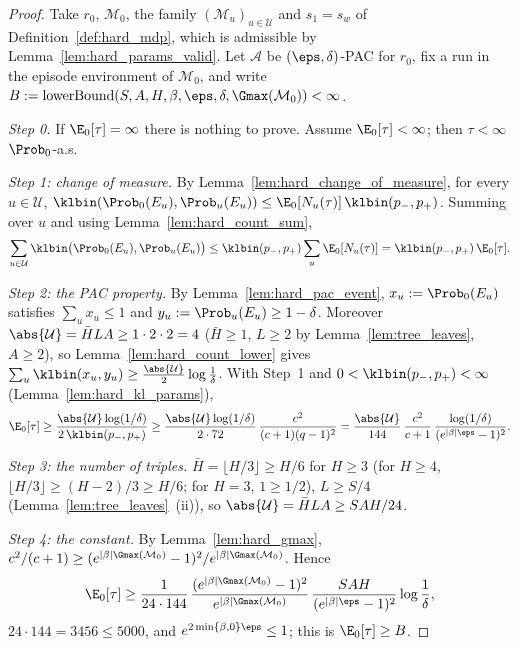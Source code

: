 \begin{proof}
\leanok
{}
Take $r_0$, $\mathcal M_0$, the family $(\mathcal M_u)_{u \in \mathcal U}$ and $s_1 = s_w$ of
Definition~\ref{def:hard_mdp}, which is admissible by Lemma~\ref{lem:hard_params_valid}. Let
$\mathcal A$ be $(\eps,\delta)$-PAC for $r_0$, fix a run in the episode environment of
$\mathcal M_0$, and write $B := \mathrm{lowerBound}(S,A,H,\beta,\eps,\delta,\Gmax(\mathcal M_0)) < \infty$.

\emph{Step 0.} If $\E_0[\tau] = \infty$ there is nothing to prove. Assume $\E_0[\tau] < \infty$;
then $\tau < \infty$ $\Prob_0$-a.s.

\emph{Step 1: change of measure.} By Lemma~\ref{lem:hard_change_of_measure}, for every
$u \in \mathcal U$, $\klbin(\Prob_0(E_u), \Prob_u(E_u)) \le \E_0[N_u(\tau)]\,\klbin(p_-,p_+)$. Summing
over $u$ and using Lemma~\ref{lem:hard_count_sum},
\[
  \sum_{u \in \mathcal U}\klbin\big(\Prob_0(E_u), \Prob_u(E_u)\big) \le \klbin(p_-,p_+)\sum_{u}\E_0[N_u(\tau)] = \klbin(p_-,p_+)\,\E_0[\tau] .
\]

\emph{Step 2: the PAC property.} By Lemma~\ref{lem:hard_pac_event}, $x_u := \Prob_0(E_u)$
satisfies $\sum_u x_u \le 1$ and $y_u := \Prob_u(E_u) \ge 1 - \delta$. Moreover
$\abs{\mathcal U} = \bar H L A \ge 1\cdot 2\cdot 2 = 4$ ($\bar H \ge 1$, $L \ge 2$ by
Lemma~\ref{lem:tree_leaves}, $A \ge 2$), so Lemma~\ref{lem:hard_count_lower} gives
$\sum_u \klbin(x_u, y_u) \ge \frac{\abs{\mathcal U}}{2}\log\frac1\delta$. With Step~1 and
$0 < \klbin(p_-,p_+) < \infty$ (Lemma~\ref{lem:hard_kl_params}),
\[
  \E_0[\tau] \ge \frac{\abs{\mathcal U}\log(1/\delta)}{2\,\klbin(p_-,p_+)} \ge \frac{\abs{\mathcal U}\log(1/\delta)}{2\cdot 72}\,\frac{c^2}{(c+1)(q-1)^2}
  = \frac{\abs{\mathcal U}}{144}\,\frac{c^2}{c+1}\,\frac{\log(1/\delta)}{(e^{|\beta|\eps}-1)^2} .
\]

\emph{Step 3: the number of triples.} $\bar H = \lfloor H/3 \rfloor \ge H/6$ for $H \ge 3$ (for
$H \ge 4$, $\lfloor H/3\rfloor \ge (H-2)/3 \ge H/6$; for $H = 3$, $1 \ge 1/2$), $L \ge S/4$
(Lemma~\ref{lem:tree_leaves}~(ii)), so $\abs{\mathcal U} = \bar H L A \ge SAH/24$.

\emph{Step 4: the constant.} By Lemma~\ref{lem:hard_gmax},
$c^2/(c+1) \ge (e^{|\beta|\Gmax(\mathcal M_0)}-1)^2/e^{|\beta|\Gmax(\mathcal M_0)}$. Hence
\[
  \E_0[\tau] \ge \frac{1}{24\cdot 144}\,\frac{(e^{|\beta|\Gmax(\mathcal M_0)}-1)^2}{e^{|\beta|\Gmax(\mathcal M_0)}}\,\frac{SAH}{(e^{|\beta|\eps}-1)^2}\log\frac1\delta ,
\]
$24 \cdot 144 = 3456 \le 5000$, and $e^{2\min\{\beta,0\}\eps} \le 1$; this is $\E_0[\tau] \ge B$.
\end{proof}

